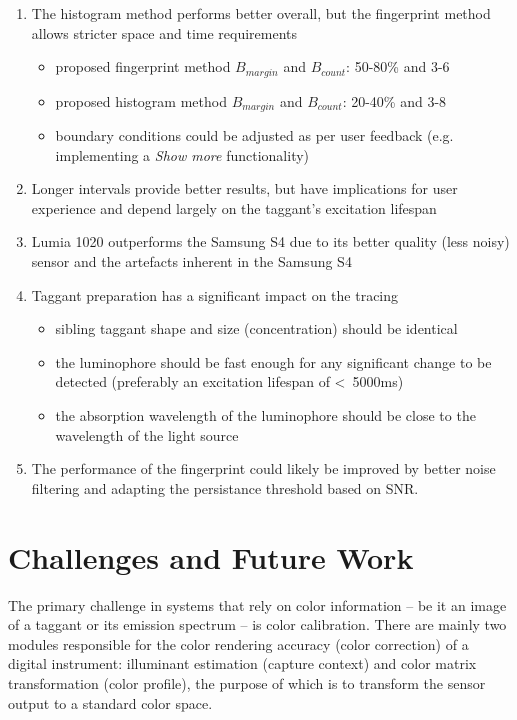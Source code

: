 \documentclass[thesis.tex]{subfiles}
\begin{document}
\begin{enumerate}
  \item The histogram method performs better overall, but the fingerprint method allows stricter space and time requirements
    \begin{itemize}
      \item proposed fingerprint method $B_{margin}$ and $B_{count}$: 50-80\% and 3-6
      \item proposed histogram method $B_{margin}$ and $B_{count}$: 20-40\% and 3-8
      \item boundary conditions could be adjusted as per user feedback (e.g. implementing a \emph{Show more} functionality)
    \end{itemize}
  \item Longer intervals provide better results, but have implications for user experience and depend largely on the taggant's excitation lifespan
  \item Lumia 1020 outperforms the Samsung S4 due to its better quality (less noisy) sensor and the artefacts inherent in the Samsung S4
  \item Taggant preparation has a significant impact on the tracing
    \begin{itemize}
      \item sibling taggant shape and size (concentration) should be identical
      \item the luminophore should be fast enough for any significant change to be detected (preferably an excitation lifespan of \textless\ 5000ms)
      \item the absorption wavelength of the luminophore should be close to the wavelength of the light source
    \end{itemize}
  \item The performance of the fingerprint could likely be improved by better noise filtering and adapting the persistance threshold based on SNR.
\end{enumerate}



\section{Challenges and Future Work}

The primary challenge in systems that rely on color information -- be it an image of a taggant or its emission spectrum -- is color calibration. There are mainly two modules responsible for the color rendering accuracy (color correction) of a digital instrument: illuminant estimation (capture context) and color matrix transformation (color profile), the purpose of which is to transform the sensor output to a standard color space.
\end{document}

